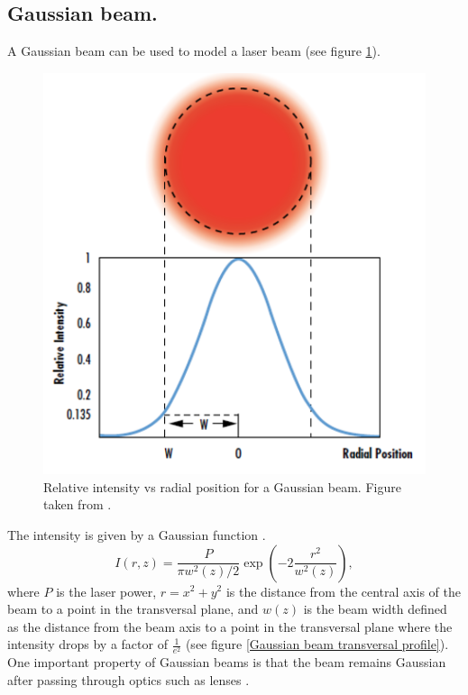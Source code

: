 \documentclass[letterpaper,12pt,oneside]{book}
\begin{document}
\subsection{Gaussian beam.}
A Gaussian beam can be used to model a laser beam (see figure \ref{Gaussianbeam}).
\begin{figure}[H]
    \centering
    \includegraphics[scale=0.5]{Pictures/Screen Shot 2023-01-23 at 9.06.07 AM.png}
    \caption{Relative intensity vs radial position for a Gaussian beam. Figure taken from \cite{Edmund}.}
    \label{Intensity vs radial position for a Gaussian beam.}
    \label{Gaussianbeam}
\end{figure}
\noindent 
The intensity is given by a Gaussian function \cite{svelto2010principles}.
\begin{equation}
    I(r,z)= \frac{P}{\pi w^2(z)/2} \exp{\left(-2\frac{r^2}{w^2(z)}\right)},
\end{equation}
where $P$ is the laser power, $r=x^2+y^2$ is the distance from the central axis of the beam to a point in the transversal plane, and $w(z)$ is the beam width defined as 
the distance from the beam axis to a point in the transversal plane where the intensity drops by a factor of $\frac{1}{e^2}$ (see figure \ref{Gaussian beam transversal profile}).
One important property of Gaussian beams is that the beam remains Gaussian after passing through optics such as lenses \cite{saleh2019fundamentals}.
\end{document}
